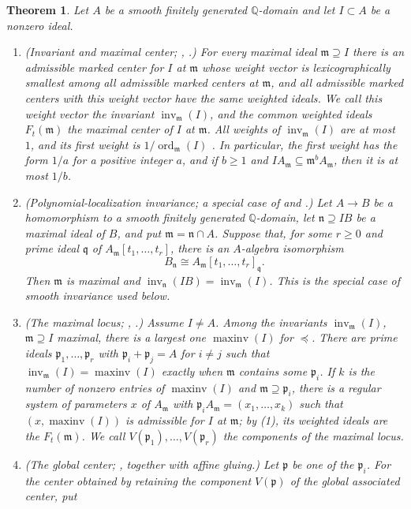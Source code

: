 \documentclass[11pt]{amsart}
\numberwithin{equation}{section}
\newtheorem{theorem}{Theorem}[section]
\theoremstyle{definition}
\newcommand{\Q}{\mathbb{Q}}
\newcommand{\fm}{\mathfrak{m}}
\newcommand{\fn}{\mathfrak{n}}
\newcommand{\fp}{\mathfrak{p}}
\newcommand{\fq}{\mathfrak{q}}
\DeclareMathOperator{\inv}{inv}
\DeclareMathOperator{\maxinv}{maxinv}
\DeclareMathOperator{\ord}{ord}
\begin{document}
\begin{theorem}\label{thm:invariant}
Let $A$ be a smooth finitely generated $\Q$-domain and let $I\subset A$ be a nonzero ideal.
\begin{enumerate}
\item \emph{(Invariant and maximal center; \cite[Theorem~5.3.1]{ATW}, \cite[Theorem~3.1.1]{Brais}.)} For every maximal ideal $\fm\supseteq I$ there is an admissible marked center for $I$ at $\fm$ whose weight vector is lexicographically smallest among all admissible marked centers at $\fm$, and all admissible marked centers with this weight vector have the same weighted ideals. We call this weight vector the \emph{invariant} $\inv_\fm(I)$, and the common weighted ideals $F_t(\fm)$ the \emph{maximal center} of $I$ at $\fm$. All weights of $\inv_\fm(I)$ are at most $1$, and its first weight is $1/\ord_\fm(I)$ \cite[Section~5.1]{ATW}. In particular, the first weight has the form $1/a$ for a positive integer $a$, and if $b\ge1$ and $IA_\fm\subseteq\fm^bA_\fm$, then it is at most $1/b$.
\item \emph{(Polynomial-localization invariance; a special case of \cite[Theorem~5.1.3(3)]{ATW} and \cite[Proposition~3.5.1]{Brais}.)} Let $A\to B$ be a homomorphism to a smooth finitely generated $\Q$-domain, let $\fn\supseteq IB$ be a maximal ideal of $B$, and put $\fm=\fn\cap A$. Suppose that, for some $r\ge0$ and prime ideal $\fq$ of $A_\fm[t_1,\ldots,t_r]$, there is an $A$-algebra isomorphism
\[
  B_\fn\cong A_\fm[t_1,\ldots,t_r]_\fq.
\]
Then $\fm$ is maximal and $\inv_\fn(IB)=\inv_\fm(I)$. This is the special case of smooth invariance used below.
\item \emph{(The maximal locus; \cite[Theorems~5.1.3(2) and~6.1.1]{ATW}, \cite[Propositions~4.1.1 and~4.1.2]{Brais}.)} Assume $I\ne A$. Among the invariants $\inv_\fm(I)$, $\fm\supseteq I$ maximal, there is a largest one $\maxinv(I)$ for $\preceq$. There are prime ideals $\fp_1,\ldots,\fp_r$ with $\fp_i+\fp_j=A$ for $i\ne j$ such that $\inv_\fm(I)=\maxinv(I)$ exactly when $\fm$ contains some $\fp_i$. If $k$ is the number of nonzero entries of $\maxinv(I)$ and $\fm\supseteq\fp_i$, there is a regular system of parameters $x$ of $A_\fm$ with $\fp_iA_\fm=(x_1,\ldots,x_k)$ such that $(x,\maxinv(I))$ is admissible for $I$ at $\fm$; by (1), its weighted ideals are the $F_t(\fm)$. We call $V(\fp_1),\ldots,V(\fp_r)$ the \emph{components} of the maximal locus.
\item \emph{(The global center; \cite[Proposition~4.1.1 and Definition~4.1.4]{Brais}, together with affine gluing.)} Let $\fp$ be one of the $\fp_i$. For the center obtained by retaining the component $V(\fp)$ of the global associated center, put

\end{enumerate}
\end{theorem}
\end{document}
